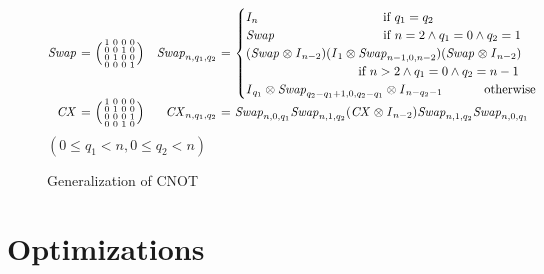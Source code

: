 \begin{figure}[t]
	\[
		\begin{array}{@{}r@{~}c@{~}l@{\quad}r@{~}c@{~}l@{}}
			\mswap{}          & = & \Smtrx{1                                                                                    & 0 & 0 & 0 \\0&0&1&0\\0&1&0&0\\0                 & 0 & 0                         & 1}
			                  &
			\mswap{n,q_1,q_2} & = & \begin{cases}
				                        I_n\qquad\qquad\qquad\qquad\qquad\text{if}\ q_1=q_2                      \\
				                        \mswap{}\ \ \qquad\qquad\qquad\qquad\text{if}\ n=2\land q_1=0\land q_2=1 \\
				                        (\mswap{}\otimes\identity{n-2})
				                        (\identity{1}\otimes\mswap{n-1,0,n-2})
				                        (\mswap{}\otimes\identity{n-2})                                          \\
				                        \quad\qquad\qquad\qquad\qquad
				                        \text{if}\ n>2\land q_1=0\land q_2=n-1                                   \\
				                        \identity{q_1}\otimes\mswap{q_2-q_1+1,0,q_2-q_1}\otimes\identity{n-q_2-1}
				                        \ \qquad\quad\text{otherwise}
			                        \end{cases}
			\\[2em]
			\mcnot{}          & = & \Smtrx{1                                                                                    & 0 & 0 & 0 \\0&1&0&0\\0&0&0&1\\0                 & 0 & 1                                                                                           & 0}
			                  &
			\mcnot{n,q_1,q_2} & = & \mswap{n,0,q_1}\mswap{n,1,q_2}(\mcnot{}\otimes\identity{n-2})\mswap{n,1,q_2}\mswap{n,0,q_1}
		\end{array}
	\]
	{\footnotesize$(0\le q_1<n,0\le q_2<n)$}
	\caption{Generalization of CNOT}
	\label{fig:cnot}
\end{figure}

\section{Optimizations}
\label{ch:consistency:optimization}

